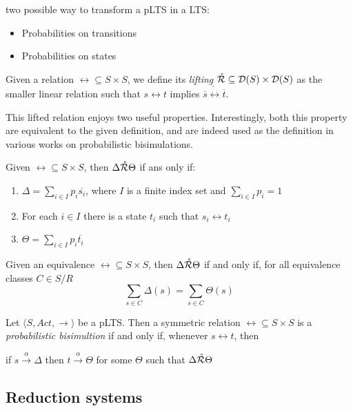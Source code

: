 two possible way to transform a pLTS in a LTS: \begin{itemize}
\item Probabilities on transitions
\item Probabilities on states
\end{itemize}


Given a relation $\rel \subseteq S \times S$, we define its \textit{lifting} $\mathring{\mathcal{R}} \subseteq \mathcal{D}(S) \times \mathcal{D}(S)$ as the smaller linear relation such that $s \rel t$ implies $\overline{s} \mathring{\rel} \overline{t}$.



This lifted relation enjoys two useful properties. Interestingly, both this property are equivalent to the given definition, and are indeed used as the definition in various works on probabilistic bisimulations.

Given $\rel \subseteq S \times S$, then $\Delta \mathring{\mathcal{R}} \Theta$ if ans only if: \begin{enumerate}
\item $\Delta = \sum_{i \in I} p_i \overline{s_i}$, where $I$ is a finite index set and $\sum_{i \in I}p_i = 1$
\item For each $i \in I$ there is a state $t_i$ such that $s_i \rel t_i$
\item $\Theta = \sum_{i\in I}p_i\overline{t_i}$ 
\end{enumerate}

Given an equivalence $\rel \subseteq S \times S$, then $\Delta \mathring{\mathcal{R}} \Theta$ if and only if, for all equivalence classes $C \in S/R$
\[\sum_{s\in C} \Delta(s) = \sum_{s\in C} \Theta(s)\]


Let $\langle S , Act, \rightarrow \rangle$ be a pLTS. Then a symmetric relation $\rel \subseteq S \times S$ is a \textit{probabilistic bisimultion} if and only if, whenever $s \rel t$, then 
\begin{center}
if $s \xrightarrow{\alpha} \Delta$ then $t \xrightarrow{\alpha} \Theta$ for some $\Theta$ such that $\Delta \mathring{\mathcal{R}} \Theta$
\end{center}

\subsection*{Reduction systems}

